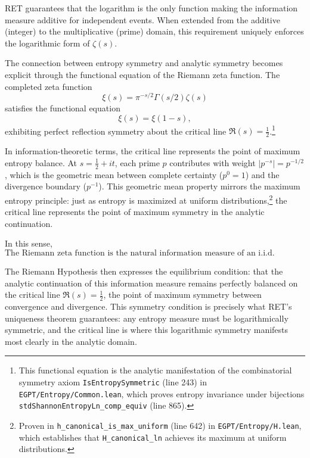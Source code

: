 \documentclass[12pt]{article}
\begin{document}
RET guarantees that the logarithm is the only function making the information measure additive for independent events. When extended from the additive (integer) to the multiplicative (prime) domain, this requirement uniquely enforces the logarithmic form of $\zeta(s)$.

The connection between entropy symmetry and analytic symmetry becomes explicit through the functional equation of the Riemann zeta function. The completed zeta function
\begin{equation}
\xi(s) = \pi^{-s/2}\Gamma(s/2)\zeta(s)
\end{equation}
satisfies the functional equation
\begin{equation}
\xi(s) = \xi(1-s),
\end{equation}
exhibiting perfect reflection symmetry about the critical line $\Re(s) = \frac{1}{2}$.\footnote{This functional equation is the analytic manifestation of the combinatorial symmetry axiom \texttt{IsEntropySymmetric} (line 243) in \texttt{EGPT/Entropy/Common.lean}, which proves entropy invariance under bijections \texttt{stdShannonEntropyLn\_comp\_equiv} (line 865).}

In information-theoretic terms, the critical line represents the point of maximum entropy balance. At $s = \frac{1}{2} + it$, each prime $p$ contributes with weight $|p^{-s}| = p^{-1/2}$, which is the geometric mean between complete certainty ($p^0 = 1$) and the divergence boundary ($p^{-1}$). This geometric mean property mirrors the maximum entropy principle: just as entropy is maximized at uniform distributions,\footnote{Proven in \texttt{h\_canonical\_is\_max\_uniform} (line 642) in \texttt{EGPT/Entropy/H.lean}, which establishes that \texttt{H\_canonical\_ln} achieves its maximum at uniform distributions.} the critical line represents the point of maximum symmetry in the analytic continuation.

In this sense,
\begin{equation}
\boxed{\text{The Riemann zeta function is the natural information measure of an i.i.d. Bernoulli process on the primes.}}
\end{equation}

The Riemann Hypothesis then expresses the equilibrium condition: that the analytic continuation of this information measure remains perfectly balanced on the critical line $\Re(s) = \frac{1}{2}$, the point of maximum symmetry between convergence and divergence. This symmetry condition is precisely what RET's uniqueness theorem guarantees: any entropy measure must be logarithmically symmetric, and the critical line is where this logarithmic symmetry manifests most clearly in the analytic domain.
\end{document}
